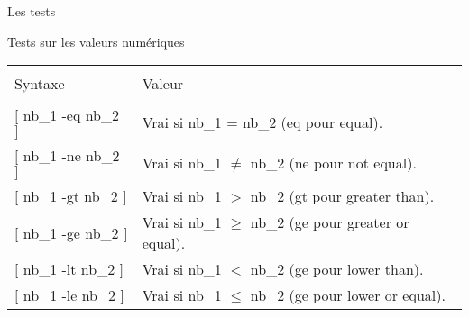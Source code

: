 \begin{frame}{Les tests}
  \begin{block}{Tests sur les valeurs numériques}
    \begin{center}
      \begin{tabular}{ll}
        \hline\\
        Syntaxe&Valeur\\
        \hline\\
        $[$ nb\_1 -eq nb\_2 $]$&Vrai si nb\_1 = nb\_2 (eq pour equal).\\[2pt]
        $[$ nb\_1 -ne nb\_2 $]$&Vrai si nb\_1 $\neq$ nb\_2 (ne pour not equal).\\[2pt]
        $[$ nb\_1 -gt nb\_2 $]$&Vrai si nb\_1 $>$ nb\_2 (gt pour greater than).\\[2pt]
        $[$ nb\_1 -ge nb\_2 $]$&Vrai si nb\_1 $\geq$ nb\_2 (ge pour greater or equal).\\[2pt]
        $[$ nb\_1 -lt nb\_2 $]$&Vrai si nb\_1 $<$ nb\_2 (ge pour lower than).\\[2pt]
        $[$ nb\_1 -le nb\_2 $]$&Vrai si nb\_1 $\leq$ nb\_2 (ge pour lower or equal).\\[2pt]
        \hline
      \end{tabular}
    \end{center}
  \end{block}

\end{frame}
